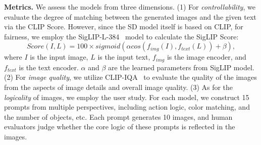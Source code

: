 \begin{table}
\vspace{-2pt}
\caption{Quantitative analysis of our LLMDiff Adapter compared with existing methods.}
\label{tab:exp}
\vspace{-5pt}
\centering
\renewcommand{\arraystretch}{1.2}
\renewcommand{\tabcolsep}{2.6pt}    
\vspace{-5pt}
\end{table}

\noindent
\textbf{Metrics.}
We assess the models from three dimensions.
(1) For \textit{controllability}, we evaluate the degree of matching between the generated images and the given text via the CLIP Score. However, since the SD model itself is based on CLIP, for fairness, we employ the SigLIP-L-384~\cite{SigLIP} model to calculate the SigLIP Score:
\begin{equation}
Score(I, L) = 100 \times sigmoid(\alpha cos(f_{img}(I), f_{text}(L)) + \beta),
\end{equation}
where $I$ is the input image, $L$ is the input text, $f_{img}$ is the image encoder, and $f_{text}$ is the text encoder.  $\alpha$ and $\beta$ are the learned parameters from SigLIP model.
(2) For \textit{image quality}, we utilize CLIP-IQA~\cite{CLIP-IQA} to evaluate the quality of the images from the aspects of image details and overall image quality. 
(3) As for the \textit{logicality} of images, we employ the user study. 
For each model, we construct 15 prompts from multiple perspectives, including action logic, color matching, and the number of objects, etc. Each prompt generates 10 images, and human evaluators judge whether the core logic of these prompts is reflected in the images.


